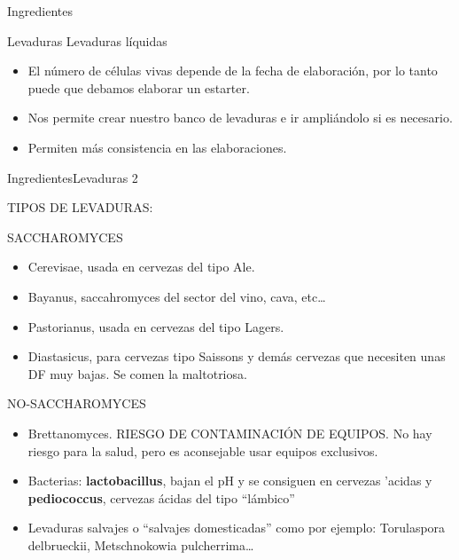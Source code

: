 \begin{frame}{Ingredientes}
\begin{block}{Levaduras}
Levaduras líquidas

\begin{itemize}
\item
  El número de células vivas depende de la fecha de elaboración, por lo
  tanto puede que debamos elaborar un estarter.
\item
  Nos permite crear nuestro banco de levaduras e ir ampliándolo si es
  necesario.
\item
  Permiten más consistencia en las elaboraciones.
\end{itemize}

IngredientesLevaduras 2

TIPOS DE LEVADURAS:

SACCHAROMYCES

\begin{itemize}
\item
  Cerevisae, usada en cervezas del tipo Ale.
\item
  Bayanus, saccahromyces del sector del vino, cava, etc\ldots{}
\item
  Pastorianus, usada en cervezas del tipo Lagers.
\item
  Diastasicus, para cervezas tipo Saissons y demás cervezas que
  necesiten unas DF muy bajas. Se comen la maltotriosa.
\end{itemize}

NO-SACCHAROMYCES

\begin{itemize}
\item
  Brettanomyces. RIESGO DE CONTAMINACIÓN DE EQUIPOS. No hay riesgo para
  la salud, pero es aconsejable usar equipos exclusivos.
\item
  Bacterias: \textbf{lactobacillus}, bajan el pH y se consiguen en
  cervezas 'acidas y \textbf{pediococcus}, cervezas ácidas del tipo
  ``lámbico''
\item
  Levaduras salvajes o ``salvajes domesticadas'' como por ejemplo:
  Torulaspora delbrueckii, Metschnokowia pulcherrima\ldots{}
\end{itemize}
\end{block}
\end{frame}

